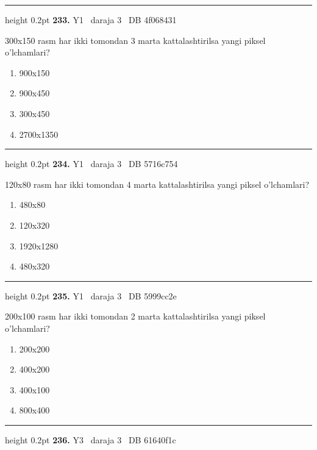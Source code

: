 \documentclass[10pt,a4paper,oneside]{article}
\begin{document}
\vspace{2mm}\hrule height 0.2pt \vspace{4mm}
\hypertarget{q233}{\textbf{\color{ink}233.}}  {\color{muted}\scriptsize Y1 \textbullet\ daraja 3 \textbullet\ DB 4f068431}
\par
300x150 rasm har ikki tomondan 3 marta kattalashtirilsa yangi piksel o'lchamlari?
\begin{enumerate}[label=\Alph*),leftmargin=9mm]
\item 900x150
\item 900x450
\item 300x450
\item 2700x1350
\end{enumerate}
\vspace{2mm}\hrule height 0.2pt \vspace{4mm}
\hypertarget{q234}{\textbf{\color{ink}234.}}  {\color{muted}\scriptsize Y1 \textbullet\ daraja 3 \textbullet\ DB 5716c754}
\par
120x80 rasm har ikki tomondan 4 marta kattalashtirilsa yangi piksel o'lchamlari?
\begin{enumerate}[label=\Alph*),leftmargin=9mm]
\item 480x80
\item 120x320
\item 1920x1280
\item 480x320
\end{enumerate}
\vspace{2mm}\hrule height 0.2pt \vspace{4mm}
\hypertarget{q235}{\textbf{\color{ink}235.}}  {\color{muted}\scriptsize Y1 \textbullet\ daraja 3 \textbullet\ DB 5999cc2e}
\par
200x100 rasm har ikki tomondan 2 marta kattalashtirilsa yangi piksel o'lchamlari?
\begin{enumerate}[label=\Alph*),leftmargin=9mm]
\item 200x200
\item 400x200
\item 400x100
\item 800x400
\end{enumerate}
\vspace{2mm}\hrule height 0.2pt \vspace{4mm}
\hypertarget{q236}{\textbf{\color{ink}236.}}  {\color{muted}\scriptsize Y3 \textbullet\ daraja 3 \textbullet\ DB 61640f1c}
\par
\end{document}
